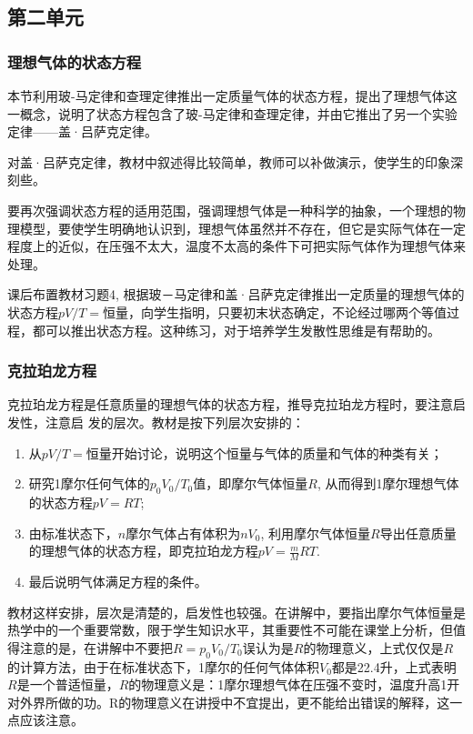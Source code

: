 \subsection{第二单元}
\subsubsection{理想气体的状态方程}

本节利用玻-马定律和查理定律推出一定质量气体的状态方程，提出了理想气体这一概念，说明了状态方程包含了玻-马定律和查理定律，并由它推出了另一个实验定律——盖·吕萨克定律。

对盖·吕萨克定律，教材中叙述得比较简单，教师可以补做演示，使学生的印象深刻些。

要再次强调状态方程的适用范围，强调理想气体是一种科学的抽象，一个理想的物理模型，要使学生明确地认识到，理想气体虽然并不存在，但它是实际气体在一定程度上的近似，在压强不太大，温度不太高的条件下可把实际气体作为理想气体来处理。

课后布置教材习题4, 根据玻－马定律和盖·吕萨克定律推出一定质量的理想气体的状态方程$pV/T=$恒量，向学生指明，只要初末状态确定，不论经过哪两个等值过程，都可以推出状态方程。这种练习，对于培养学生发散性思维是有帮助的。

\subsubsection{克拉珀龙方程}

克拉珀龙方程是任意质量的理想气体的状态方程，推导克拉珀龙方程时，要注意启发性，注意启
发的层次。教材是按下列层次安排的：
\begin{enumerate}
\item 从$pV/T=$恒量开始讨论，说明这个恒量与气体的质量和气体的种类有关；
\item 研究1摩尔任何气体的$p_0V_0/T_0$值，即摩尔气体恒量$R$, 从而得到1摩尔理想气体的状态方程$pV=RT$;
\item 由标准状态下，$n$摩尔气体占有体积为$nV_0$, 利用摩尔气体恒量$R$导出任意质量的理想气体的状态方程，即克拉珀龙方程$pV=\frac{m}{M}RT$.
\item 最后说明气体满足方程的条件。
\end{enumerate}

教材这样安排，层次是清楚的，启发性也较强。在讲解中，要指出摩尔气体恒量是热学中的一个重要常数，限于学生知识水平，其重要性不可能在课堂上分析，但值得注意的是，在讲解中不要把$R=p_0V_0/T_0$误认为是$R$的物理意义，上式仅仅是$R$的计算方法，由于在标准状态下，1摩尔的任何气体体积$V_0$都是22.4升，上式表明$R$是一个普适恒量，$R$的物理意义是：1摩尔理想气体在压强不变时，温度升高1开对外界所做的功。R的物理意义在讲授中不宜提出，更不能给出错误的解释，这一点应该注意。

